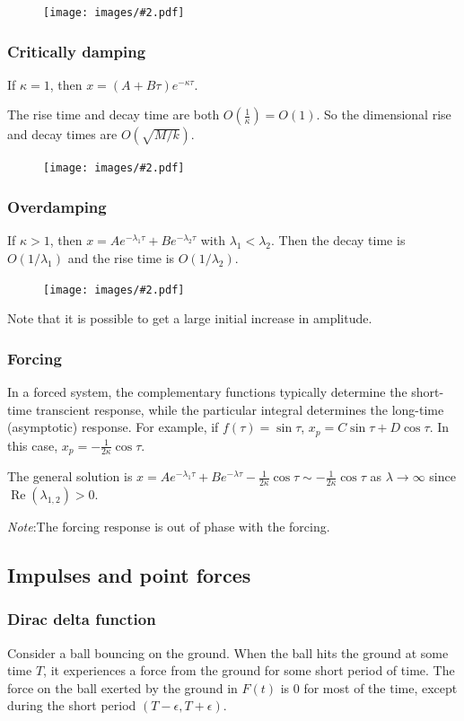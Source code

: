 \documentclass[a4paper]{article}
\theoremstyle{definition}
\newcommand{\note}{\noindent \emph{Note}:\;}
\newcommand{\img}[2][]{\begin{figure}[ht]\centering\texttt{[image: images/\#2.pdf]}\end{figure}}
\DeclareMathOperator\re{Re}
\begin{document}
\img[width=250pt]{de_16}
\subsubsection{Critically damping}
If $\kappa = 1$, then $x = (A + B\tau)e^{-\kappa\tau}$.

The rise time and decay time are both $O(\frac{1}{\kappa}) = O(1)$. So the dimensional rise and decay times are $O(\sqrt{M/k})$.

\newpage %
\img[width=250pt]{de_17}

\subsubsection{Overdamping}
If $\kappa > 1$, then $x = Ae^{-\lambda_1\tau} + Be^{-\lambda_2\tau}$ with $\lambda_1 < \lambda_2$. Then the decay time is $O(1/\lambda_1)$ and the rise time is $O(1/\lambda_2)$.

\img[width=250pt]{de_18}
Note that it is possible to get a large initial increase in amplitude.

\subsubsection{Forcing}
In a forced system, the complementary functions typically determine the short-time transcient response, while the particular integral determines the long-time (asymptotic) response.
For example, if $f(\tau) = \sin\tau$, $x_p = C\sin \tau + D\cos\tau$. In this case, $x_p = -\frac{1}{2\kappa}\cos\tau$.

The general solution is $x = Ae^{-\lambda_1\tau} + Be^{-\lambda \tau} - \frac{1}{2\kappa}\cos\tau \sim -\frac{1}{2\kappa}\cos\tau$ as $\lambda\to \infty$ since $\re (\lambda_{1, 2}) > 0$.

\note The forcing response is out of phase with the forcing.
\subsection{Impulses and point forces}
\subsubsection{Dirac delta function}
Consider a ball bouncing on the ground. When the ball hits the ground at some time $T$, it experiences a force from the ground for some short period of time. The force on the ball exerted by the ground in $F(t)$ is $0$ for most of the time, except during the short period $(T - \epsilon, T + \epsilon)$.
\end{document}
